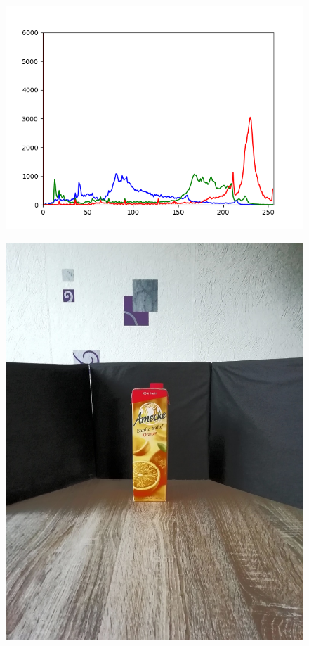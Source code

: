 \begin{appendices}
\begin{figure}[htb]
\begin{minipage}[c]{0.08\textwidth}
\end{minipage}
\hfill
\begin{minipage}[c]{0.3\textwidth}
\includegraphics[width=\textwidth]{Sources/Bild2_HA_histo.png}
\end{minipage}
\end{figure}
\begin{figure}[htb]
\begin{minipage}[c]{0.2\textwidth}
\includegraphics[width=\textwidth]{Sources/Bild3_HA.jpg}

\end{minipage}
\end{figure}
\end{appendices}
